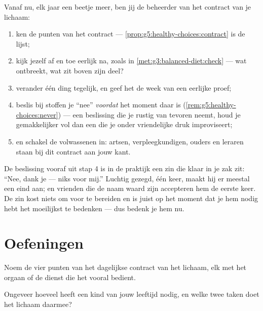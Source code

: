 \begin{method}\label{met:g5:healthy-choices:run}
Vanaf nu, elk jaar een beetje meer, ben jij de beheerder van het contract
van je lichaam:
\begin{enumerate}
  \item ken de punten van het contract ---
        \cref{prop:g5:healthy-choices:contract} is de lijst;
  \item kijk jezelf af en toe eerlijk na, zoals in
        \cref{met:g3:balanced-diet:check} --- wat ontbreekt, wat zit
        boven zijn deel?
  \item verander één ding tegelijk, en geef het de week van een eerlijke
        proef;
  \item beslis bij stoffen je ``nee'' \emph{voordat} het moment daar is
        (\cref{rem:g5:healthy-choices:never}) --- een beslissing die je
        rustig van tevoren neemt, houd je gemakkelijker vol dan een die
        je onder vriendelijke druk improviseert;
  \item en schakel de volwassenen in: artsen, verpleegkundigen, ouders
        en leraren staan bij dit contract aan jouw kant.
\end{enumerate}
\end{method}

\begin{example}\label{ex:g5:healthy-choices:answers}
De beslissing vooraf uit stap 4 is in de praktijk een zin die klaar in je
zak zit: ``Nee, dank je --- niks voor mij.'' Luchtig gezegd, één keer,
maakt hij er meestal een eind aan; en vrienden die de naam waard zijn
accepteren hem de eerste keer. De zin kost niets om voor te bereiden en
is juist op het moment dat je hem nodig hebt het moeilijkst te bedenken
--- dus bedenk je hem nu.
\end{example}

\section{Oefeningen}

\begin{exercise}[$\star$]\label{exo:g5:healthy-choices:1}
Noem de vier punten van het dagelijkse contract van het lichaam, elk met
het orgaan of de dienst die het vooral bedient.
\end{exercise}

\begin{exercise}[$\star$]\label{exo:g5:healthy-choices:2}
Ongeveer hoeveel  heeft een kind van jouw leeftijd nodig, en welke
twee taken doet het lichaam daarmee?
\end{exercise}

